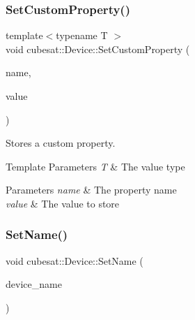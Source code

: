 \subsubsection{\texorpdfstring{Set\+Custom\+Property()}{SetCustomProperty()}}
{\footnotesize\ttfamily template$<$typename T $>$ \\
void cubesat\+::\+Device\+::\+Set\+Custom\+Property (\begin{DoxyParamCaption}\item[{const std\+::string \&}]{name,  }\item[{T}]{value }\end{DoxyParamCaption})\hspace{0.3cm}{\ttfamily [inline]}}



Stores a custom property. 


\begin{DoxyTemplParams}{Template Parameters}
{\em T} & The value type \\
\hline
\end{DoxyTemplParams}

\begin{DoxyParams}{Parameters}
{\em name} & The property name \\
\hline
{\em value} & The value to store \\
\hline
\end{DoxyParams}
\mbox{\label{classcubesat_1_1Device_a90374e827bf35d0ec47d5983b55a892b}} 
\subsubsection{\texorpdfstring{Set\+Name()}{SetName()}}
{\footnotesize\ttfamily void cubesat\+::\+Device\+::\+Set\+Name (\begin{DoxyParamCaption}\item[{const std\+::string \&}]{device\+\_\+name }\end{DoxyParamCaption})\hspace{0.3cm}{\ttfamily [inline]}}

\mbox{\label{classcubesat_1_1Device_ae273ac30edc470b3623853d74fd22e90}} 

